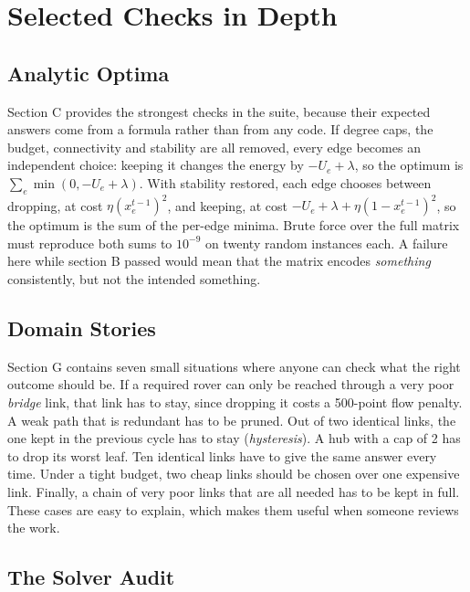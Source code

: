 \section{Selected Checks in Depth}

\subsection{Analytic Optima}

Section C provides the strongest checks in the suite, because their expected
answers come from a formula rather than from any code. If degree caps, the
budget, connectivity and stability are all removed, every edge becomes an
independent choice: keeping it changes the energy by $-U_e+\lambda$, so the
optimum is $\sum_e\min(0,-U_e+\lambda)$. With stability restored, each edge
chooses between dropping, at cost $\eta(x_e^{t-1})^2$, and keeping, at cost
$-U_e+\lambda+\eta(1-x_e^{t-1})^2$, so the optimum is the sum of the per-edge
minima. Brute force over the full matrix must reproduce both sums to
$10^{-9}$ on twenty random instances each. A failure here while section B
passed would mean that the matrix encodes \emph{something} consistently, but
not the intended something.

\subsection{Domain Stories}

Section G contains seven small situations where anyone can check what the
right outcome should be. If a required rover can only be reached through a
very poor \emph{bridge} link, that link has to stay, since dropping it costs a
500-point flow penalty. A weak path that is redundant has to be pruned. Out of
two identical links, the one kept in the previous cycle has to stay
(\emph{hysteresis}). A hub with a cap of 2 has to drop its worst leaf. Ten
identical links have to give the same answer every time. Under a tight budget,
two cheap links should be chosen over one expensive link. Finally, a chain of
very poor links that are all needed has to be kept in full. These cases are
easy to explain, which makes them useful when someone reviews the work.



\subsection{The Solver Audit}

